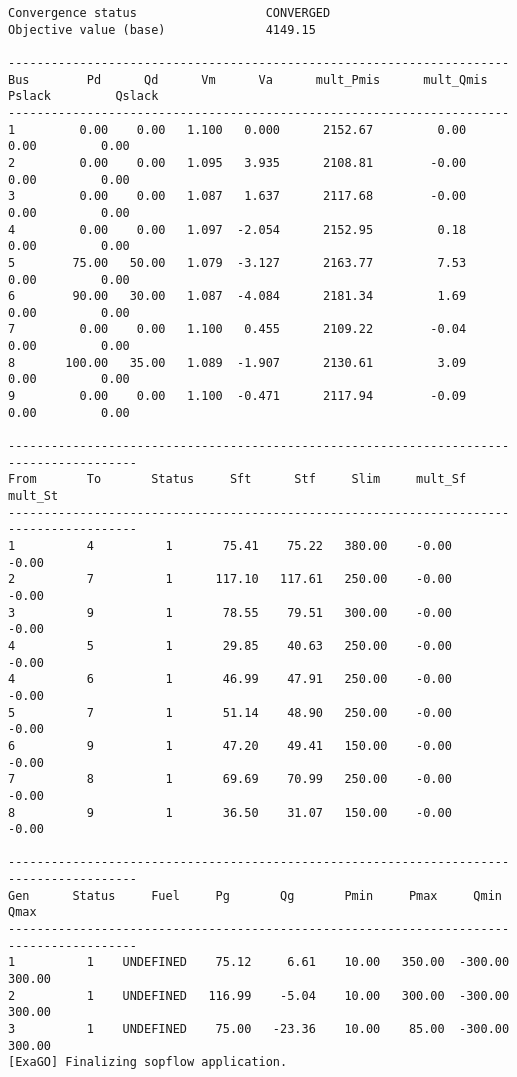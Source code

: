 \begin{lstlisting}
Convergence status                  CONVERGED
Objective value (base)              4149.15

----------------------------------------------------------------------
Bus        Pd      Qd      Vm      Va      mult_Pmis      mult_Qmis      Pslack         Qslack        
----------------------------------------------------------------------
1         0.00    0.00   1.100   0.000      2152.67         0.00         0.00         0.00
2         0.00    0.00   1.095   3.935      2108.81        -0.00         0.00         0.00
3         0.00    0.00   1.087   1.637      2117.68        -0.00         0.00         0.00
4         0.00    0.00   1.097  -2.054      2152.95         0.18         0.00         0.00
5        75.00   50.00   1.079  -3.127      2163.77         7.53         0.00         0.00
6        90.00   30.00   1.087  -4.084      2181.34         1.69         0.00         0.00
7         0.00    0.00   1.100   0.455      2109.22        -0.04         0.00         0.00
8       100.00   35.00   1.089  -1.907      2130.61         3.09         0.00         0.00
9         0.00    0.00   1.100  -0.471      2117.94        -0.09         0.00         0.00

----------------------------------------------------------------------------------------
From       To       Status     Sft      Stf     Slim     mult_Sf  mult_St 
----------------------------------------------------------------------------------------
1          4          1       75.41    75.22   380.00    -0.00    -0.00
2          7          1      117.10   117.61   250.00    -0.00    -0.00
3          9          1       78.55    79.51   300.00    -0.00    -0.00
4          5          1       29.85    40.63   250.00    -0.00    -0.00
4          6          1       46.99    47.91   250.00    -0.00    -0.00
5          7          1       51.14    48.90   250.00    -0.00    -0.00
6          9          1       47.20    49.41   150.00    -0.00    -0.00
7          8          1       69.69    70.99   250.00    -0.00    -0.00
8          9          1       36.50    31.07   150.00    -0.00    -0.00

----------------------------------------------------------------------------------------
Gen      Status     Fuel     Pg       Qg       Pmin     Pmax     Qmin     Qmax  
----------------------------------------------------------------------------------------
1          1    UNDEFINED    75.12     6.61    10.00   350.00  -300.00   300.00
2          1    UNDEFINED   116.99    -5.04    10.00   300.00  -300.00   300.00
3          1    UNDEFINED    75.00   -23.36    10.00    85.00  -300.00   300.00
[ExaGO] Finalizing sopflow application.
\end{lstlisting}

